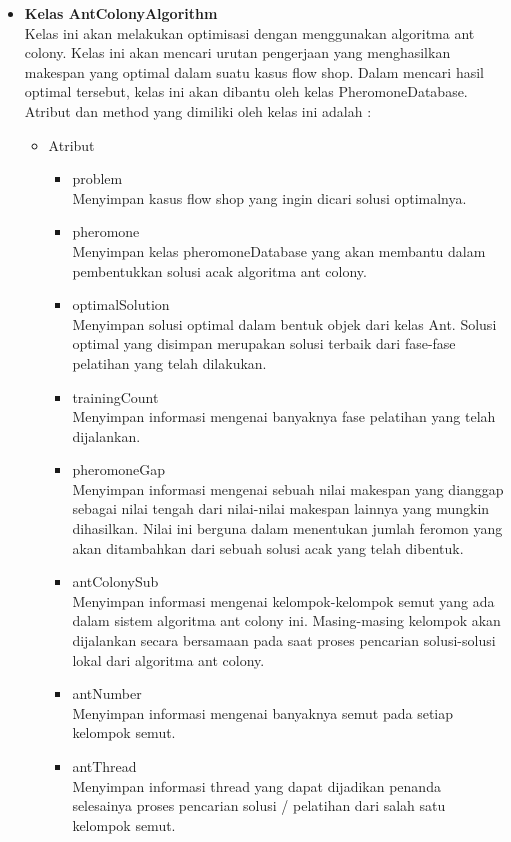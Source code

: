 \begin{itemize}
		\item \textbf{Kelas AntColonyAlgorithm} \\
		Kelas ini akan melakukan optimisasi dengan menggunakan algoritma ant colony. Kelas ini
		akan mencari urutan pengerjaan yang menghasilkan makespan yang optimal dalam suatu
		kasus flow shop. Dalam mencari hasil optimal tersebut, kelas ini akan dibantu oleh
		kelas PheromoneDatabase. Atribut dan method yang dimiliki oleh kelas ini adalah :
		\begin{itemize}
			\item Atribut
			\begin{itemize}
				\item problem \\
				Menyimpan kasus flow shop yang ingin dicari solusi optimalnya.
				\item pheromone \\
				Menyimpan kelas pheromoneDatabase yang akan membantu dalam pembentukkan
				solusi acak algoritma ant colony.
				\item optimalSolution \\
				Menyimpan solusi optimal dalam bentuk objek dari kelas Ant. Solusi optimal yang
				disimpan merupakan solusi terbaik dari fase-fase pelatihan yang telah dilakukan.
				\item trainingCount \\
				Menyimpan informasi mengenai banyaknya fase pelatihan yang telah dijalankan.
				\item pheromoneGap \\
				Menyimpan informasi mengenai sebuah nilai makespan yang dianggap sebagai nilai
				tengah dari nilai-nilai makespan lainnya yang mungkin dihasilkan. Nilai ini berguna
				dalam menentukan jumlah feromon yang akan ditambahkan dari sebuah solusi acak
				yang telah dibentuk.
				\item antColonySub \\
				Menyimpan informasi mengenai kelompok-kelompok semut yang ada dalam sistem
				algoritma ant colony ini. Masing-masing kelompok akan dijalankan secara bersamaan
				pada saat proses pencarian solusi-solusi lokal dari algoritma ant colony.
				\item antNumber \\
				Menyimpan informasi mengenai banyaknya semut pada setiap kelompok semut.
				\item antThread \\
				Menyimpan informasi thread yang dapat dijadikan penanda selesainya proses pencarian
				solusi / pelatihan dari salah satu kelompok semut.

\end{itemize}
\end{itemize}
\end{itemize}
